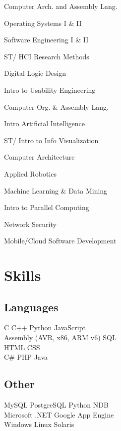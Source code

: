 \documentclass[letterpaper]{deedy-resume} %
\begin{document}
\begin{minipage}[t]{0.33\textwidth}
\begin{tightitemize}
\item Computer Arch. and Assembly Lang.
\item Operating Systems I \& II
\item Software Engineering I \& II
\item ST/ HCI Research Methods
\item Digital Logic Design
\item Intro to Usability Engineering
\item Computer Org. \& Assembly Lang.
\item Intro Artificial Intelligence
\item ST/ Intro to Info Visualization
\item Computer Architecture
\item Applied Robotics
\item Machine Learning \& Data Mining
\item Intro to Parallel Computing
\item Network Security
\item Mobile/Cloud Software Development
\end{tightitemize}

\sectionspace %


\section{Skills}

\subsection{Languages}

C \textbullet{} C++ \textbullet{} Python \textbullet{} JavaScript \\
Assembly (AVR, x86, ARM v6) \textbullet{} SQL\\
HTML \textbullet{} CSS\\
C\# \textbullet{} PHP \textbullet{} Java

\subsection{Other}
MySQL \textbullet{} PostgreSQL \textbullet{} Python NDB\\
Microsoft .NET \textbullet{} Google App Engine\\
Windows \textbullet{} Linux \textbullet{} Solaris\\


\sectionspace %


\end{minipage} %
\end{document}

